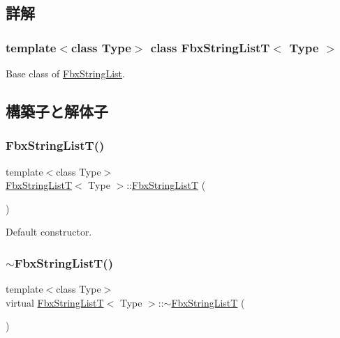 \subsection{詳解}
\subsubsection*{template$<$class Type$>$\newline
class Fbx\+String\+List\+T$<$ Type $>$}

Base class of \hyperlink{class_fbx_string_list}{Fbx\+String\+List}. 

\subsection{構築子と解体子}
\mbox{\label{class_fbx_string_list_t_a23b6c1e63569190855827463157c6e89}} 
\subsubsection{\texorpdfstring{Fbx\+String\+List\+T()}{FbxStringListT()}}
{\footnotesize\ttfamily template$<$class Type$>$ \\
\hyperlink{class_fbx_string_list_t}{Fbx\+String\+ListT}$<$ Type $>$\+::\hyperlink{class_fbx_string_list_t}{Fbx\+String\+ListT} (\begin{DoxyParamCaption}{ }\end{DoxyParamCaption})}



Default constructor. 

\mbox{\label{class_fbx_string_list_t_a15d3f55726d1d30f0f87d7ade9bcc2ab}} 
\subsubsection{\texorpdfstring{$\sim$\+Fbx\+String\+List\+T()}{~FbxStringListT()}}
{\footnotesize\ttfamily template$<$class Type$>$ \\
virtual \hyperlink{class_fbx_string_list_t}{Fbx\+String\+ListT}$<$ Type $>$\+::$\sim$\hyperlink{class_fbx_string_list_t}{Fbx\+String\+ListT} (\begin{DoxyParamCaption}{ }\end{DoxyParamCaption})\hspace{0.3cm}{\ttfamily [virtual]}}



